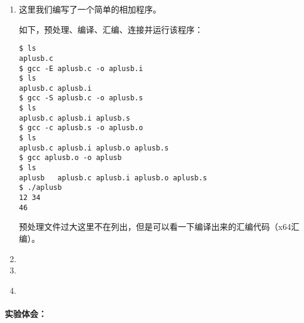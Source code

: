 \documentclass[cs4size,a4paper,nofonts]{ctexart}
\begin{document}
\begin{enumerate}

\item 
这里我们编写了一个简单的相加程序。

{\linespread{1}}

如下，预处理、编译、汇编、连接并运行该程序：
\begin{Verbatim}
$ ls
aplusb.c
$ gcc -E aplusb.c -o aplusb.i
$ ls
aplusb.c aplusb.i
$ gcc -S aplusb.c -o aplusb.s
$ ls
aplusb.c aplusb.i aplusb.s
$ gcc -c aplusb.s -o aplusb.o
$ ls
aplusb.c aplusb.i aplusb.o aplusb.s
$ gcc aplusb.o -o aplusb
$ ls
aplusb   aplusb.c aplusb.i aplusb.o aplusb.s
$ ./aplusb
12 34
46
\end{Verbatim}

预处理文件过大这里不在列出，但是可以看一下编译出来的汇编代码（x64汇编）。
{\linespread{1}}

\item 


\item 


\item 


\begin{figure}[htp]
\end{figure}

\end{enumerate}

\paragraph{实验体会：}\quad
\end{document}
